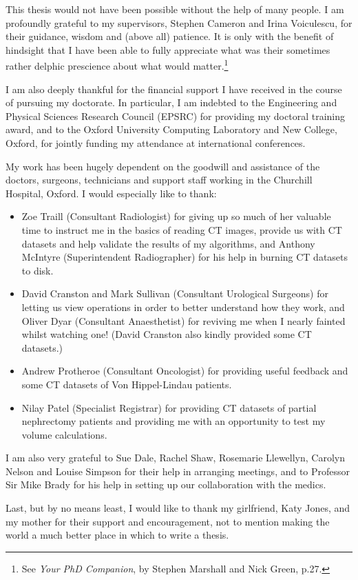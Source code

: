 \begin{acknowledgements}
This thesis would not have been possible without the help of many people. I am profoundly grateful to my supervisors, Stephen Cameron and Irina Voiculescu, for their guidance, wisdom and (above all) patience. It is only with the benefit of hindsight that I have been able to fully appreciate what was their sometimes rather delphic prescience about what would matter.\footnote{See \emph{Your PhD Companion}, by Stephen Marshall and Nick Green, p.27.}

I am also deeply thankful for the financial support I have received in the course of pursuing my doctorate. In particular, I am indebted to the Engineering and Physical Sciences Research Council (EPSRC) for providing my doctoral training award, and to the Oxford University Computing Laboratory and New College, Oxford, for jointly funding my attendance at international conferences.

My work has been hugely dependent on the goodwill and assistance of the doctors, surgeons, technicians and support staff working in the Churchill Hospital, Oxford. I would especially like to thank:
%
\begin{itemize}

\item Zoe Traill (Consultant Radiologist) for giving up so much of her valuable time to instruct me in the basics of reading CT images, provide us with CT datasets and help validate the results of my algorithms, and Anthony McIntyre (Superintendent Radiographer) for his help in burning CT datasets to disk.

\item David Cranston and Mark Sullivan (Consultant Urological Surgeons) for letting us view operations in order to better understand how they work, and Oliver Dyar (Consultant Anaesthetist) for reviving me when I nearly fainted whilst watching one! (David Cranston also kindly provided some CT datasets.)

\item Andrew Protheroe (Consultant Oncologist) for providing useful feedback and some CT datasets of Von Hippel-Lindau patients.

\item Nilay Patel (Specialist Registrar) for providing CT datasets of partial nephrectomy patients and providing me with an opportunity to test my volume calculations.

\end{itemize}
%
I am also very grateful to Sue Dale, Rachel Shaw, Rosemarie Llewellyn, Carolyn Nelson and Louise Simpson for their help in arranging meetings, and to Professor Sir Mike Brady for his help in setting up our collaboration with the medics.

Last, but by no means least, I would like to thank my girlfriend, Katy Jones, and my mother for their support and encouragement, not to mention making the world a much better place in which to write a thesis.

\end{acknowledgements}
